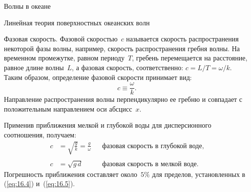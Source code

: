 \begin{chapter}{Волны в океане}
\begin{section}{Линейная теория поверхностных океанских волн}
\begin{paragraph}{Фазовая скорость.}
Фазовой скоростью~$c$ 
называется скорость распространения некоторой фазы волны, например, скорость
распространения гребня волны. На временном промежутке, равном периоду~$T$,
гребень перемещается на расстояние, равное длине волны~$L$, а фазовая 
скорость, соответственно: $c=L/T= \omega /k$. 
Таким образом, определение фазовой скорости принимает вид:
   \begin{equation}
      c \equiv \frac {\omega}{k}.
   \end{equation}
Направление распространения волны перпендикулярно ее гребню и совпадает
с положительным направлением оси абсцисс~$x$. 
%

Применив приближения мелкой и глубокой воды для дисперсионного соотношения, 
получаем:
  \begin{align}
   c &= \sqrt{\frac{g}{k}} = \frac{g}{\omega} & & \text{фазовая скорость в глубокой воде,} \label{eq:16.7}\\
   & &  & \nonumber \\
   c &=\sqrt{g\,d} & & \text{фазовая скорость в мелкой воде.}\label{eq:16.8}
  \end{align}
Погрешность приближения составляет около~$5\%$ для пределов, 
установленных в (\ref{eq:16.4}) и~(\ref{eq:16.5}).
%


\end{paragraph}
\end{section}
\end{chapter}

